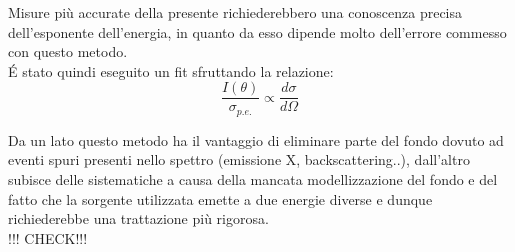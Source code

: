 \documentclass[8pt]{extarticle}
\begin{document}
Misure più accurate della presente richiederebbero una conoscenza precisa dell'esponente dell'energia, in quanto da esso dipende molto dell'errore commesso con questo metodo. \\

\'E stato quindi eseguito un fit sfruttando la relazione: \\
\begin{equation}
\frac{I(\theta)}{\sigma_{p.e.}} \propto \frac{d\sigma}{d\Omega}
\end{equation}

Da un lato questo metodo ha il vantaggio di eliminare parte del fondo dovuto ad eventi spuri presenti nello spettro (emissione X, backscattering..), dall'altro subisce delle sistematiche a causa della mancata modellizzazione del fondo e del fatto che
la sorgente utilizzata emette a due energie diverse e dunque richiederebbe una trattazione più rigorosa. \\ !!! CHECK!!!
\end{document}
